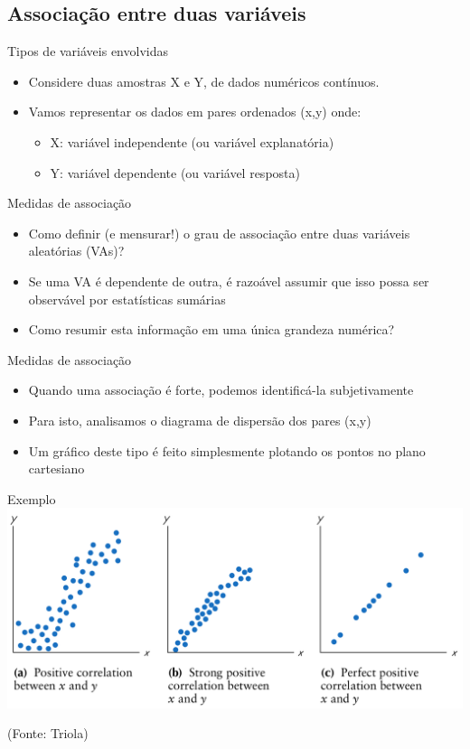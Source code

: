 \documentclass{beamer}
\begin{document}
\subsection[Associação]{Associação entre duas variáveis}

\begin{frame}{Tipos de variáveis envolvidas}
  \begin{itemize}
  \item Considere duas amostras X e Y, de dados numéricos contínuos.
  \item Vamos representar os dados em pares ordenados (x,y) onde:
    \begin{itemize}
    \item X: variável independente (ou variável explanatória)
    \item Y: variável dependente (ou variável resposta)
    \end{itemize}
  \end{itemize}
\end{frame}

\begin{frame}{Medidas de associação}
  \begin{itemize}
  \item Como definir (e mensurar!) o grau de associação entre duas
    variáveis aleatórias (VAs)?
  \item Se uma VA é dependente de outra, é razoável assumir que isso
    possa ser observável por estatísticas sumárias
  \item Como resumir esta informação em uma única grandeza numérica?
  \end{itemize}
\end{frame}

\begin{frame}{Medidas de associação}
  \begin{itemize}
  \item Quando uma associação é forte, podemos identificá-la
    subjetivamente
  \item Para isto, analisamos o diagrama de dispersão dos pares (x,y)
  \item Um gráfico deste tipo é feito simplesmente plotando os pontos
    no plano cartesiano
  \end{itemize}
\end{frame}

\begin{frame}{Exemplo}
  \includegraphics[height=0.6\textheight]{Assoc/positive}

  (Fonte: Triola)
\end{frame}
\end{document}
